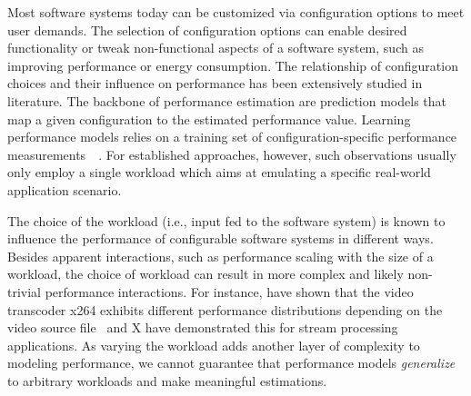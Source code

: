 
Most software systems today can be customized via configuration options to meet user demands. The selection of configuration options can enable desired functionality or tweak non-functional aspects of a software system, such as improving performance or energy consumption. The relationship of configuration choices and their influence on performance has been extensively studied in literature. The backbone of performance estimation are prediction models that map a given configuration to the estimated performance value. Learning performance models relies on a training set of configuration-specific performance measurements~~\cite{dorn2020,siegmundPerformanceinfluenceModelsHighly2015,haDeepPerf2019,perfAL,guoVariabilityawarePerformancePrediction2013,sarkarCostEfficientSamplingPerformance,guo_2018_data,fourier_learning_2015,perLasso}. For established approaches, however, such observations usually only employ a single workload which aims at emulating a specific real-world application scenario.

The choice of the workload (i.e., input fed to the software system) is known to influence the performance of configurable software systems in different ways. Besides apparent interactions, such as performance scaling with the size of a workload, the choice of workload can result in more complex and likely non-trivial performance interactions. For instance, \citeauthor{alves_sampling_2020} have shown that the video transcoder x264 exhibits different performance distributions depending on the video source file~\cite{alves_sampling_2020} and X have demonstrated this for stream processing applications. As varying the workload adds another layer of complexity to modeling performance, we cannot guarantee that performance models \textit{generalize} to arbitrary workloads and make meaningful estimations. 

